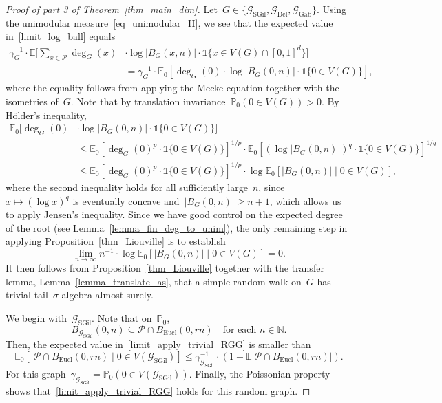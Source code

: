 \documentclass[a4paper,11pt]{article}
\newcommand{\EE}{\mathbb{E}}
\newcommand{\PP}{\mathbb{P}}
\newcommand{\NN}{\mathbb{N}}
\theoremstyle{definition}
\begin{document}
\begin{proof}[Proof of part 3 of Theorem~\ref{thm_main_dim}]
Let~$G \in \{ \mathcal G_\mathrm{SGil}, \mathcal G_\mathrm{Del}, \mathcal G_\mathrm{Gab} \}$. Using the unimodular measure~\eqref{eq_unimodular_H}, we see that the expected value in~\eqref{limit_log_ball} equals
\begin{equation}\label{eq_trivial_G_1}
\begin{aligned}
\gamma_G^{-1} \cdot \EE\Big[ \sum_{x \in \mathcal P}  \deg_G(x) & \cdot  \log |B_G(x,n)|  \cdot \mathds{1} \{x \in V(G) \cap [0,1]^d \} \Big] \\[2mm]
& = \gamma_G^{-1} \cdot \EE_0[ \deg_G(0) \cdot \log |B_G(0,n)| \cdot \mathds{1} \{0 \in V(G) \} ],
\end{aligned}
\end{equation}
where the equality follows from applying the Mecke equation together with the isometries of~$G$. Note that by translation invariance~$\PP_0(0 \in V(G))>0$. By Hölder's inequality,
\begin{equation}\label{eq_trivial_G_2}
\begin{aligned}
\EE_0[ \deg_G(0) & \cdot \log|B_G(0,n)|  \cdot  \mathds{1} \{0 \in V(G) \} ] \\[2mm]
& \leq \EE_0[ \deg_G(0)^p \cdot \mathds{1}\{0 \in V(G)\}]^{1/p} \cdot \EE_0[ (\log |B_G(0,n)|)^q \cdot \mathds{1} \{0 \in V(G) \} ]^{1/q} \\[2mm]
& \leq \EE_0[ \deg_G(0)^p \cdot \mathds{1}\{0 \in V(G)\}]^{1/p} \cdot  \log  \EE_0[ |B_G(0,n)| \mid 0 \in V(G) ],
\end{aligned}
\end{equation}
where the second inequality holds for all sufficiently large~$n$, since~$x \mapsto (\log x)^q$ is eventually concave and~$|B_G(0,n)| \ge n+1$, which allows us to apply Jensen’s inequality. Since we have good control on the expected degree of the root (see Lemma~\ref{lemma_fin_deg_to_unim}), the only remaining step in applying Proposition~\ref{thm_Liouville} is to establish
\begin{equation}\label{limit_apply_trivial_RGG}
\lim_{n \to \infty} n^{-1} \cdot \log \EE_0 [|B_G(0,n)| \mid 0 \in V(G)] = 0.
\end{equation}
It then follows from Proposition~\ref{thm_Liouville} together with the transfer lemma, Lemma~\ref{lemma_translate_as}, that a simple random walk on~$G$ has trivial tail~$\sigma$-algebra almost surely.

We begin with~$\mathcal G_\mathrm{SGil}$. Note that on~$\PP_0$,
$$ B_{\mathcal G_\mathrm{SGil}}(0,n) \subseteq \mathcal P \cap B_\mathrm{Eucl}(0,rn) \quad \text{for each } n \in \NN. $$
Then, the expected value in~\eqref{limit_apply_trivial_RGG} is smaller than
$$\EE_0[ |\mathcal P \cap B_\mathrm{Eucl}(0,rn) \mid 0 \in V(\mathcal G_\mathrm{SGil}) ] \leq \gamma_{\mathcal G_\mathrm{SGil}}^{-1} \cdot \left( 1 + \EE | \mathcal P \cap B_\mathrm{Eucl}(0,rn) | \right). $$
For this graph~$\gamma_{\mathcal G_\mathrm{SGil}} = \PP_0( 0 \in V(\mathcal G_\mathrm{SGil}) )$. Finally, the Poissonian property shows that~\eqref{limit_apply_trivial_RGG} holds for this random graph. 


\end{proof}
\end{document}
